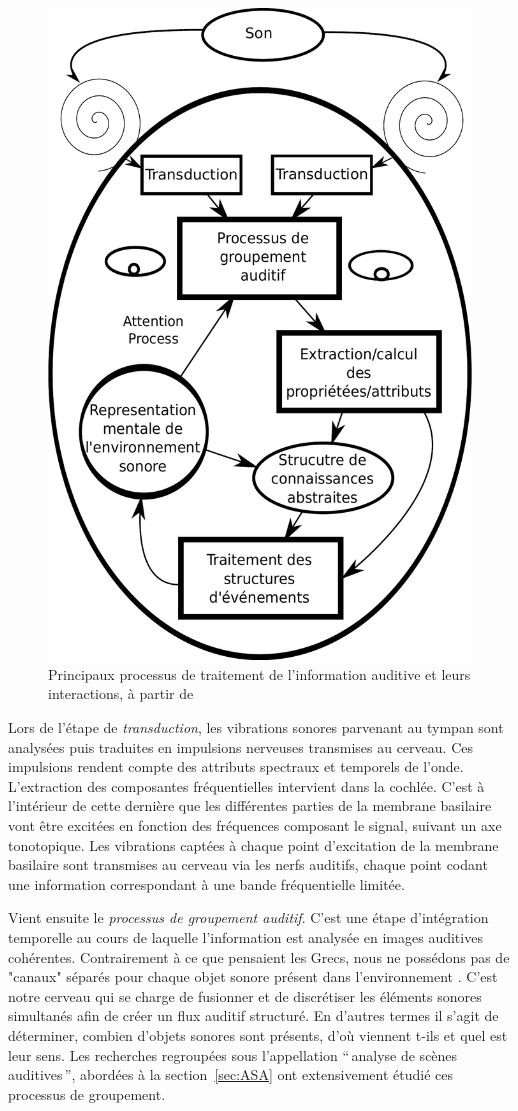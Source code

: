 \begin{figure}[bth]
        \myfloatalign
        \includegraphics[width=.6\linewidth]{gfx/traitementSonMcAdamsBigand}
        \caption[Principaux processus de traitement de l'information auditive et leurs interactions]{Principaux processus de traitement de l'information auditive et leurs interactions, à partir de \citep{mcadams1994penser}}\label{fig:traitementSonMcAdamsBigand}
\end{figure}

Lors de l'étape de \emph{transduction}, les vibrations sonores parvenant au tympan sont analysées puis traduites en impulsions nerveuses transmises au cerveau. Ces impulsions rendent compte des attributs spectraux et temporels de l'onde. L'extraction des composantes fréquentielles intervient dans la cochlée. C'est à l'intérieur de cette dernière que les différentes parties de la membrane basilaire vont être excitées en fonction des fréquences composant le signal, suivant un axe tonotopique. Les vibrations captées à chaque point d’excitation de la membrane basilaire sont transmises au cerveau via les nerfs auditifs, chaque point codant une information correspondant à une bande fréquentielle limitée. 

Vient ensuite le \emph{processus de groupement auditif}. C'est une étape d'intégration temporelle au cours de laquelle l'information est analysée en images auditives cohérentes. Contrairement à ce que pensaient les Grecs, nous ne possédons pas de "canaux" séparés pour chaque objet sonore présent dans l'environnement \citep{yost1994fundamentals}. C'est notre cerveau qui se charge de fusionner et de discrétiser les éléments sonores simultanés afin de créer un flux auditif structuré. En d'autres termes il s'agit de déterminer, combien d'objets sonores sont présents, d'où viennent t-ils et quel est leur sens. Les recherches regroupées sous l'appellation ``\,analyse de scènes auditives\,'', abordées à la section~\ref{sec:ASA} ont  extensivement étudié ces processus de groupement.

